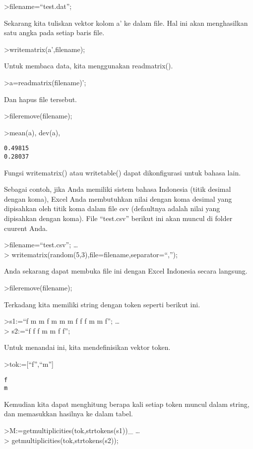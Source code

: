 \documentclass[
]{book}
\begin{document}
\textgreater filename=``test.dat'';

Sekarang kita tuliskan vektor kolom a' ke dalam file. Hal ini akan menghasilkan satu angka pada setiap baris file.

\textgreater writematrix(a',filename);

Untuk membaca data, kita menggunakan readmatrix().

\textgreater a=readmatrix(filename)';

Dan hapus file tersebut.

\textgreater fileremove(filename);

\textgreater mean(a), dev(a),

\begin{verbatim}
0.49815
0.28037
\end{verbatim}

Fungsi writematrix() atau writetable() dapat dikonfigurasi untuk bahasa lain.

Sebagai contoh, jika Anda memiliki sistem bahasa Indonesia (titik desimal dengan koma), Excel Anda membutuhkan nilai dengan koma desimal yang dipisahkan oleh titik koma dalam file csv (defaultnya adalah nilai yang dipisahkan dengan koma). File ``test.csv'' berikut ini akan muncul di folder cuurent Anda.

\textgreater filename=``test.csv''; \ldots{}\\
\textgreater{} writematrix(random(5,3),file=filename,separator=``,'');

Anda sekarang dapat membuka file ini dengan Excel Indonesia secara langsung.

\textgreater fileremove(filename);

Terkadang kita memiliki string dengan token seperti berikut ini.

\textgreater s1:=``f m m f m m m f f f m m f''; \ldots{}\\
\textgreater{} s2:=``f f f m m f f'';

Untuk menandai ini, kita mendefinisikan vektor token.

\textgreater tok:={[}``f'',``m''{]}

\begin{verbatim}
f
m
\end{verbatim}

Kemudian kita dapat menghitung berapa kali setiap token muncul dalam string, dan memasukkan hasilnya ke dalam tabel.

\textgreater M:=getmultiplicities(tok,strtokens(s1))\_ \ldots{}\\
\textgreater{} getmultiplicities(tok,strtokens(s2));
\end{document}
